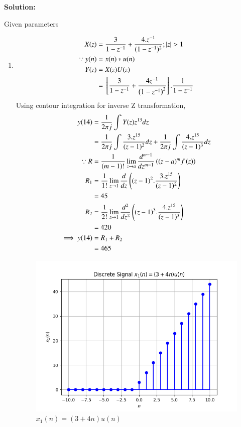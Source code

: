 \documentclass[journal,12pt,twocolumn]{IEEEtran}
\theoremstyle{remark}
\begin{document}
\textbf{Solution:} 
    \begin{table}[!h] 
    \centering
    
    \caption{Given parameters}
    \label{given parameters list}
    \end{table}
\begin{enumerate} 
    \item\begin{align}
        X(z) &= \frac{3}{1-z^{-1}} + \frac{4.z^{-1}}{(1-z^{-1})^2} ; |z|>1\\
        \because y(n) &= x(n) * u(n)\\
        Y(z) &= X(z)U(z)\\
        &= \sbrak{\frac{3}{1-z^{-1}} + \frac{4 z^{-1}}{\brak{1-z^{-1}}^2} }.\frac{1}{1-z^{-1}}
    \end{align}
    Using contour integration for inverse Z transformation,
    \begin{align}
        y(14) &= \frac{1}{2\pi j}\int Y(z) z^{13} dz \\
         &= \frac{1}{2\pi j}\int \frac{3.z^{15}}{(z-1)^{2}} dz + \frac{1}{2\pi j}\int \frac{4.z^{15}}{(z-1)^{3}} dz\\
        \because R&=\frac{1}{\left(m-1\right)!}\lim\limits_{z\to a}\frac{d^{m-1}}{dz^{m-1}}\left({(z-a)}^{m}f\left(z\right)\right)\\
        R_1 &=\frac{1}{1!}\lim\limits_{z\to 1}\frac{d}{dz}\left((z-1)^2.\frac{3.z^{15}}{(z-1)^{2}}\right)\\
        &= 45\\
        R_2 &=\frac{1}{2!}\lim\limits_{z\to 1}\frac{d^2}{dz^2}\left((z-1)^3.\frac{4.z^{15}}{(z-1)^{3}}\right)\\
        &= 420\\
        \implies y(14) &= R_1 + R_2 \\
        &= 465
    \end{align}
    
    \begin{figure}[!h] 
    \centering
    \includegraphics[width=\columnwidth]{figs/signal_x1.png}
    \caption{$x_1(n)=(3+4n)u(n)$}
    \label{fig:Graph1}
    \end{figure}
    

\end{enumerate}
\end{document}
